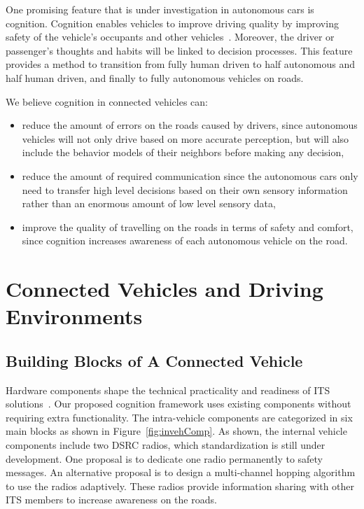 \documentclass[journal, 11pt]{IEEEtran}
\begin{document}
One promising feature that is under investigation in autonomous cars is
cognition. Cognition enables vehicles to improve driving quality by improving
safety of the vehicle's occupants and other vehicles~\cite{cogcar}. Moreover,
the driver or passenger's thoughts and habits will be linked to decision
processes. This feature provides a method to transition from fully human driven
to half autonomous and half human driven, and finally to fully autonomous
vehicles on roads.

We believe cognition in connected vehicles can:

\begin{itemize}
  \item reduce the amount of errors on the roads caused by drivers, since
  autonomous vehicles will not only drive based on more accurate perception, but
  will also include the behavior models of their neighbors before making any
  decision,
  \item reduce the amount of required communication since the autonomous cars
  only need to transfer high level decisions based on their own sensory
  information rather than an enormous amount of low level sensory data,
  \item improve the quality of travelling on the roads in terms of safety and
  comfort, since cognition increases awareness of each autonomous vehicle on the
  road.
\end{itemize} 

\section{Connected Vehicles and Driving Environments}

\subsection{Building Blocks of A Connected Vehicle}

Hardware components shape the technical practicality and readiness of ITS
solutions~\cite{hardingNHTSA14}. Our proposed cognition framework uses existing
components without requiring extra functionality. The intra-vehicle components
are categorized in six main blocks as shown in Figure~\ref{fig:invehComp}. As
shown, the internal vehicle components include two DSRC radios, which
standardization is still under development. One proposal is to dedicate one
radio permanently to safety messages. An alternative proposal is to design a
multi-channel hopping algorithm to use the radios adaptively. These radios
provide information sharing with other ITS members to increase awareness on the
roads.
\end{document}
